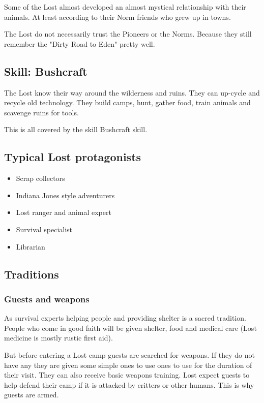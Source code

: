 Some of the Lost almost developed an almost mystical relationship with their animals. At least according to their Norm friends who grew up in towns.

The Lost do not necessarily trust the Pioneers or the Norms. Because they still remember the "Dirty Road to Eden" pretty well.

\subsection{Skill: Bushcraft}

The Lost know their way around the wilderness and ruins. They can up-cycle and recycle old technology. They build camps, hunt, gather food, train animals and scavenge ruins for tools.

This is all covered by the skill Bushcraft skill.

\subsection{Typical Lost protagonists}

\begin{itemize}
    \item Scrap collectors
    \item Indiana Jones style adventurers
    \item Lost ranger and animal expert
    \item Survival specialist
    \item Librarian
\end{itemize}

\subsection{Traditions}

\subsubsection{Guests and weapons}

As survival experts helping people and providing shelter is a sacred tradition. People who come in good faith will be given shelter, food and medical care (Lost medicine is mostly rustic first aid).

But before entering a Lost camp guests are searched for weapons. If they do not have any they are given some simple ones to use ones to use for the duration of their visit. They can also receive basic weapons training. Lost expect guests to help defend their camp if it is attacked by critters or other humans. This is why guests are armed.

